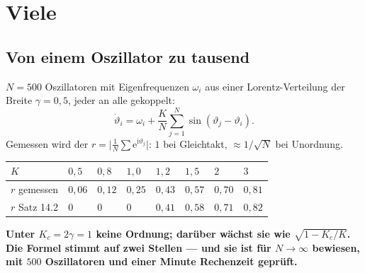 \chapter{Viele}

\section{Von einem Oszillator zu tausend}

\begin{merksatz}
$N = 500$ Oszillatoren mit Eigenfrequenzen $\omega_i$ aus einer Lorentz-Verteilung der Breite $\gamma = 0{,}5$, jeder an alle gekoppelt:
\[ \dot\vartheta_i = \omega_i + \frac{K}{N}\sum_{j=1}^{N}\sin(\vartheta_j - \vartheta_i) . \]
Gemessen wird der  $r = \bigl|\tfrac1N\sum\mathrm e^{\mathrm i\vartheta_j}\bigr|$: $1$ bei Gleichtakt, $\approx 1/\sqrt N$ bei Unordnung.

\begin{center}
{\small
\renewcommand{\arraystretch}{1.46}
\begin{tabular}{@{}P{1.6cm}P{1.0cm}P{1.0cm}P{1.0cm}P{1.0cm}P{1.0cm}P{1.0cm}P{1.0cm}@{}}
\toprule
$K$ & $0{,}5$ & $0{,}8$ & $1{,}0$ & $1{,}2$ & $1{,}5$ & $2$ & $3$\\
\midrule
$r$ gemessen & $0{,}06$ & $0{,}12$ & $0{,}25$ & $0{,}43$ & $0{,}57$ & $0{,}70$ & $0{,}81$\\
$r$ Satz 14.2 & $0$ & $0$ & $0$ & $0{,}41$ & $0{,}58$ & $0{,}71$ & $0{,}82$\\
\bottomrule
\end{tabular}}
\end{center}

\begin{center}
\begin{minipage}{0.9\textwidth}
\textbf{Unter $K_c = 2\gamma = 1$ keine Ordnung; darüber wächst sie wie $\sqrt{1 - K_c/K}$. Die Formel stimmt auf zwei Stellen --- und sie ist für $N \to \infty$ bewiesen, mit $500$ Oszillatoren und einer Minute Rechenzeit geprüft.}
\end{minipage}
\end{center}

\begin{center}
\begin{minipage}{0.88\textwidth}
\end{minipage}
\end{center}
\end{merksatz}

